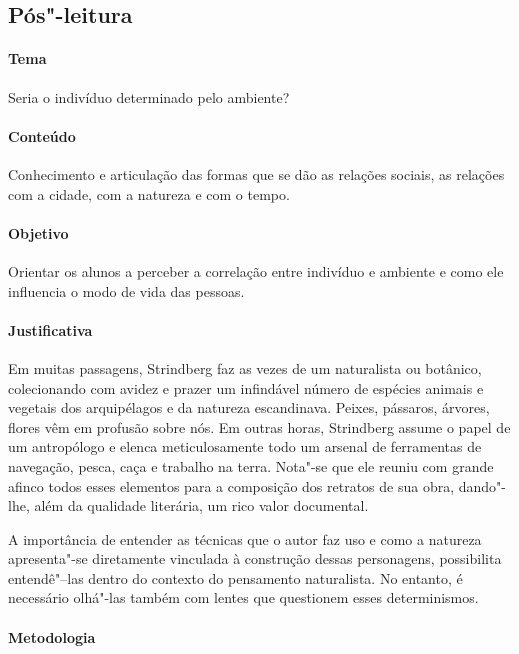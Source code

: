\documentclass[12pt]{extarticle}
\begin{document}
\subsection{Pós"-leitura}

\paragraph{Tema} Seria o indivíduo determinado pelo ambiente? 

\paragraph{Conteúdo} Conhecimento e articulação das formas que se dão as 
relações sociais, as relações com a cidade, com a natureza e com o tempo.

\paragraph{Objetivo} Orientar os alunos a perceber a 
correlação entre indivíduo e ambiente e como ele influencia o modo de vida 
das pessoas.

\paragraph{Justificativa} Em muitas passagens, Strindberg
faz as vezes de um naturalista ou botânico, colecionando
com avidez e prazer um infindável número de espécies
animais e vegetais dos arquipélagos e da natureza escandinava.
Peixes, pássaros, árvores, flores vêm em profusão
sobre nós. Em outras horas, Strindberg assume o papel
de um antropólogo e elenca meticulosamente todo um arsenal
de ferramentas de navegação, pesca, caça e trabalho na
terra. Nota"-se que ele reuniu com grande afinco todos esses
elementos para a composição dos retratos de sua obra, dando"-lhe,
além da qualidade literária, um rico valor documental.

A importância de entender as técnicas que o autor faz uso e como a natureza 
apresenta"-se diretamente vinculada à construção dessas personagens, 
possibilita entendê"--las dentro do contexto do pensamento naturalista. 
No entanto, é necessário olhá"-las também com lentes que questionem esses determinismos.

\paragraph{Metodologia}
\end{document}
